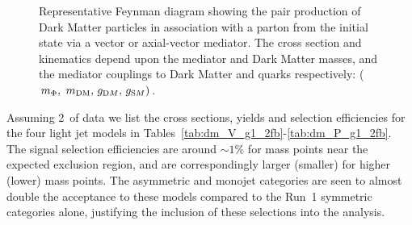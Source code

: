 \begin{figure}[h!] \centering
{}
\caption{Representative Feynman diagram showing the pair production of Dark
Matter particles in association with a parton from the initial state via a
vector or axial-vector mediator. The cross section and kinematics depend upon
the mediator and Dark Matter masses, and the mediator couplings to Dark Matter
and quarks respectively: ($m_{\Phi} ,\ m_\textrm{DM} ,\, g_{\textrm DM} ,\,
g_{\textrm SM})$. \cite{Abercrombie:2015wmb}} \label{fig:DMfeynman} \end{figure}



Assuming 2~\ifb of data we list the cross sections, yields and selection 
efficiencies for the four light jet models in
Tables~\ref{tab:dm_V_g1_2fb}-\ref{tab:dm_P_g1_2fb}. The signal selection
efficiencies are around $\sim 1$\% for mass points near the expected exclusion
region, and are correspondingly larger (smaller) for higher (lower) mass points.
The asymmetric and monojet categories are seen to almost double the acceptance
to these models compared to the Run~1 symmetric categories alone, justifying the
inclusion of these selections into the analysis.

\clearpage 
 \clearpage
 \clearpage
 \clearpage
 \clearpage


